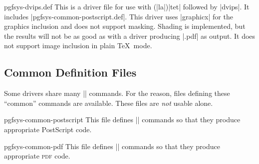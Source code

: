 \begin{filedescription}{pgfsys-dvips.def}
  This is a driver file for use with (|la|)|tet| followed by
  |dvips|. It includes |pgfsys-common-postscript.def|. This driver
  uses |graphicx| for the graphics inclusion and does not support
  masking. Shading is implemented, but the results will not be
  as good as with a driver producing |.pdf| as output. It does not
  support image inclusion in plain \TeX\ mode.
\end{filedescription}


\subsection{Common Definition Files}

Some drivers share many |\pgfsys@| commands. For the reason, files
defining these ``common'' commands are available. These files are
\emph{not} usable alone.

\begin{filedescription}{pgfsys-common-postscript}
  This file defines |\pgfsys@| commands so that they produce
  appropriate PostScript code.
\end{filedescription}

\begin{filedescription}{pgfsys-common-pdf}
  This file defines |\pgfsys@| commands so that they produce
  appropriate \textsc{pdf} code.
\end{filedescription}

